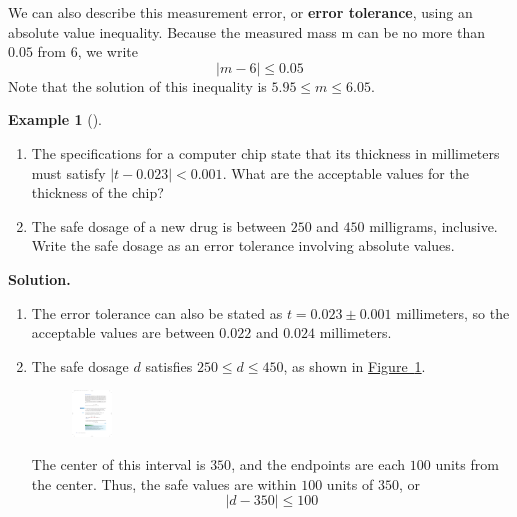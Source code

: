 \documentclass[10pt,]{book}
\newcommand{\terminology}[1]{\textbf{#1}}
\theoremstyle{plain}
\theoremstyle{definition}
\theoremstyle{definition}
\theoremstyle{definition}
\newtheorem{example}[theorem]{Example}
\theoremstyle{definition}
\theoremstyle{definition}
\numberwithin{equation}{section}
\newcommand\abs[1]{\left|#1\right|}
\newcommand{\lt}{ < }
\begin{document}
    We can also describe this measurement error, or \terminology{error tolerance}, using an absolute value inequality. Because the measured mass m can be no more than \(0.05\) from \(6\), we write 
    \begin{equation*}\abs{m − 6} ≤ 0.05\end{equation*} 
    Note that the solution of this inequality is \(5.95 \le m \le 6.05\).
%
\begin{example}[]\label{example-tolerance-chip-and-dosage}
\leavevmode%
\begin{enumerate}[label=*\alph**]
\item\hypertarget{li-369}{}The specifications for a computer chip state that its thickness in millimeters must satisfy \(\abs{t − 0.023} \lt 0.001\). What are the acceptable values for the thickness of the chip?\item\hypertarget{li-370}{}The safe dosage of a new drug is between \(250\) and \(450\) milligrams, inclusive. Write the safe dosage as an error tolerance involving absolute values.\end{enumerate}
\par\medskip\noindent%
\textbf{Solution.}\quad \leavevmode%
\begin{enumerate}[label=*\alph**]
\item\hypertarget{li-371}{}The error tolerance can also be stated as \(t = 0.023 \pm 0.001\) millimeters, so the acceptable values are between \(0.022\) and \(0.024\) millimeters.\item\hypertarget{li-372}{}The safe dosage \(d\) satisfies \(250 \le d \le 450\), as shown in \hyperref[fig-dosage-tolerance]{Figure~\ref{fig-dosage-tolerance}}.
        \leavevmode%
\begin{figure}
\centering
\includegraphics[width=0.100\textwidth,]{images/fig-dosage-tolerance.pdf}\caption{\label{fig-dosage-tolerance}}
\end{figure}

        The center of this interval is \(350\), and the endpoints are each \(100\) units from the center. Thus, the safe values are within \(100\) units of \(350\), or
        \begin{equation*}\abs{d − 350} ≤ 100\end{equation*}\end{enumerate}
\end{example}
\end{document}
